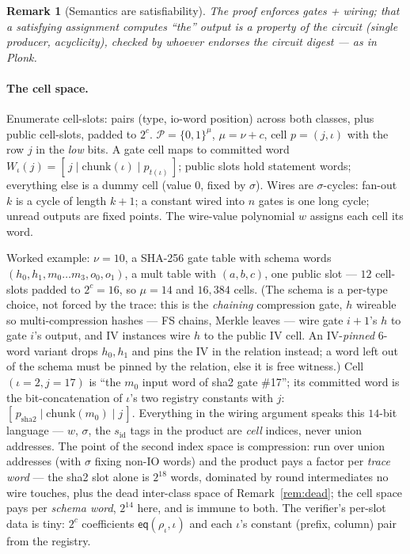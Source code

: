 \documentclass[11pt]{article}
\newcommand{\eq}{\mathsf{eq}}
\newcommand{\sid}{s_{\mathrm{id}}}
\newcommand{\cells}{\mathcal{P}}
\newtheorem{remark}{Remark}
\theoremstyle{definition}
\begin{document}
\begin{remark}[Semantics are satisfiability]
The proof enforces gates + wiring; that a satisfying assignment computes
``the'' output is a property of the circuit (single producer, acyclicity),
checked by whoever endorses the circuit digest — as in Plonk.
\end{remark}

\paragraph{The cell space.} Enumerate cell-slots: pairs (type, io-word
position) across both classes, plus public cell-slots, padded to $2^c$.
$\cells = \{0,1\}^{\mu}$, $\mu = \nu + c$, cell $p = (j, \iota)$ with the
row $j$ in the \emph{low} bits. A gate cell maps to committed word
$W_\iota(j) = [\, j \mid \mathrm{chunk}(\iota) \mid p_{t(\iota)}\,]$;
public slots hold statement words; everything else is a dummy cell (value
0, fixed by $\sigma$). Wires are $\sigma$-cycles: fan-out $k$ is a cycle
of length $k{+}1$; a constant wired into $n$ gates is one long cycle;
unread outputs are fixed points. The wire-value polynomial $w$ assigns
each cell its word.

Worked example: $\nu = 10$, a SHA-256 gate table with schema words
$(h_0, h_1, m_0 \ldots m_3, o_0, o_1)$, a mult table with $(a, b, c)$,
one public slot --- $12$ cell-slots padded to $2^c = 16$, so $\mu = 14$
and $16{,}384$ cells. (The schema is a per-type choice, not forced by
the trace: this is the \emph{chaining} compression gate, $h$ wireable so
multi-compression hashes --- FS chains, Merkle leaves --- wire gate
$i{+}1$'s $h$ to gate $i$'s output, and IV instances wire $h$ to the
public IV cell. An IV-\emph{pinned} 6-word variant drops $h_0, h_1$ and
pins the IV in the relation instead; a word left out of the schema must
be pinned by the relation, else it is free witness.) Cell $(\iota{=}2, j{=}17)$ is ``the $m_0$ input
word of sha2 gate \#17''; its committed word is the bit-concatenation of
$\iota$'s two registry constants with $j$:
$[\,p_{\mathrm{sha2}} \mid \mathrm{chunk}(m_0) \mid j\,]$. Everything in
the wiring argument speaks this $14$-bit language --- $w$, $\sigma$, the
$\sid$ tags in the product are \emph{cell} indices, never union
addresses. The point of the second index space is compression: run over
union addresses (with $\sigma$ fixing non-IO words) and the product pays
a factor per \emph{trace word} --- the sha2 slot alone is $2^{18}$
words, dominated by round intermediates no wire touches, plus the dead
inter-class space of Remark~\ref{rem:dead}; the cell space pays per
\emph{schema word}, $2^{14}$ here, and is immune to both. The verifier's
per-slot data is tiny: $2^c$ coefficients $\eq(\rho_\iota, \iota)$ and
each $\iota$'s constant (prefix, column) pair from the registry.
\end{document}
